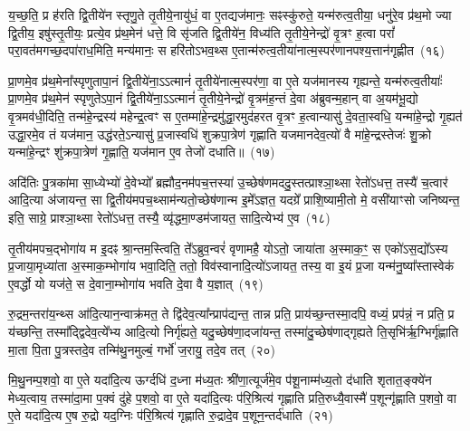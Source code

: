 य॒च्छ॒ति॒ प्र ह॑रति द्वि॒तीये॑न स्तृणु॒ते तृ॒तीये॒नायु॑धं॒ वा ए॒तद्यज॑मानः॒ सꣴस्कु॑रुते॒ यन्म॑रुत्व॒तीया॒ धनु॑रे॒व प्र॑थ॒मो ज्या द्वि॒तीय॒ इषु॑स्तृ॒तीयः॒ प्रत्ये॒व प्र॑थ॒मेन॑ धत्ते॒ वि सृ॑जति द्वि॒तीये॑न॒ विध्य॑ति तृ॒तीये॒नेन्द्रो॑ वृ॒त्रꣳ ह॒त्वा परां᳚ परा॒वत॑मगच्छ॒दपा॑राध॒मिति॒ मन्य॑मानः॒ स हरि॑तो\-ऽभव॒थ्स ए॒तान्म॑रुत्व॒तीया॑नात्म॒स्पर॑णानपश्य॒त्तान॑गृह्णीत~(१६)

प्रा॒णमे॒व प्र॑थ॒मेना᳚स्पृणुतापा॒नं द्वि॒तीये॑ना॒ऽऽत्मानं॑ तृ॒तीये॑नात्म॒स्पर॑णा॒ वा ए॒ते यज॑मानस्य गृह्यन्ते॒ यन्म॑रुत्व॒तीयाः᳚ प्रा॒णमे॒व प्र॑थ॒मेन॑ स्पृणुते\-ऽपा॒नं द्वि॒तीये॑ना॒ऽऽत्मानं॑ तृ॒तीये॒नेन्द्रो॑ वृ॒त्रम॑ह॒न्तं दे॒वा अ॑ब्रुवन्म॒हान् वा अ॒यम॑भू॒द्यो वृ॒त्रमव॑धी॒दिति॒ तन्म॑हे॒न्द्रस्य॑ महेन्द्र॒त्वꣳ स ए॒तम्मा॑हे॒न्द्रमु॑द्धा॒रमुद॑हरत वृ॒त्रꣳ ह॒त्वान्यासु॑ दे॒वता॒स्वधि॒ यन्मा॑हे॒न्द्रो गृ॒ह्यत॑ उद्धा॒रमे॒व तं यज॑मान॒ उद्ध॑रते॒\-ऽन्यासु॑ प्र॒जास्वधि॑ शुक्रपा॒त्रेण॑ गृह्णाति यजमानदेव॒त्यो॑ वै मा॑हे॒न्द्रस्तेजः॑ शु॒क्रो यन्मा॑हे॒न्द्रꣳ शु॑क्रपा॒त्रेण॑ गृ॒ह्णाति॒ यज॑मान ए॒व तेजो॑ दधाति॥~(१७)

{\anuvakamend[{प्र॒थ॒मेना॑गृह्णीत दे॒वता᳚स्व॒ष्टाविꣳ॑शतिश्च}]}%

अदि॑तिः पु॒त्रका॑मा सा॒ध्येभ्यो॑ दे॒वेभ्यो᳚ ब्रह्मौद॒नम॑पच॒त्तस्या॑ उ॒च्छेष॑णमददु॒स्तत्प्राश्ञा॒थ्सा रेतो॑\-ऽधत्त॒ तस्यै॑ च॒त्वार॑ आदि॒त्या अ॑जायन्त॒ सा द्वि॒तीय॑मपच॒थ्साम॑न्यतो॒च्छेष॑णान्म इ॒मे᳚\-ऽज्ञत॒ यदग्रे᳚ प्राशि॒ष्यामी॒तो मे॒ वसी॑याꣳसो जनिष्यन्त॒ इति॒ साग्रे॒ प्राश्ञा॒थ्सा रेतो॑\-ऽधत्त॒ तस्यै॒ व्यृ॑द्धमा॒ण्डम॑जायत॒ सादि॒त्येभ्य॑ ए॒व~(१८)

तृ॒तीय॑मपच॒द्भोगा॑य म इ॒दꣴ श्रा॒न्तम॒स्त्विति॒ ते᳚\-ऽब्रुव॒न्वरं॑ वृणामहै॒ यो\-ऽतो॒ जाया॑ता अ॒स्माक॒ꣳ॒ स एको॑\-ऽस॒द्यो᳚\-ऽस्य प्र॒जाया॒मृध्या॑ता अ॒स्माक॒म्भोगा॑य भवा॒दिति॒ ततो॒ विव॑स्वानादि॒त्यो॑\-ऽजायत॒ तस्य॒ वा इ॒यं प्र॒जा यन्म॑नु॒ष्या᳚स्तास्वेक॑ ए॒वर्द्धो यो यज॑ते॒ स दे॒वाना॒म्भोगा॑य भवति दे॒वा वै य॒ज्ञात्~(१९)

रु॒द्रम॒न्तरा॑य॒न्थ्स आ॑दि॒त्यान॒न्वाक्र॑मत॒ ते द्वि॑देव॒त्या᳚न्प्राप॑द्यन्त॒ तान्न प्रति॒ प्राय॑च्छ॒न्तस्मा॒दपि॒ वध्यं॒ प्रप॑न्नं॒ न प्रति॒ प्र य॑च्छन्ति॒ तस्मा᳚द्द्विदेव॒त्ये᳚भ्य आदि॒त्यो निर्गृ॑ह्यते॒ यदु॒च्छेष॑णा॒दजा॑यन्त॒ तस्मा॑दु॒च्छेष॑णाद्गृह्यते ति॒सृभि॑र्\mbox{}ऋ॒ग्भिर्गृ॑ह्णाति मा॒ता पि॒ता पु॒त्रस्तदे॒व तन्मि॑थु॒नमुल्बं॒ गर्भो॑ ज॒रायु॒ तदे॒व तत्~(२०)

मि॒थु॒नम्प॒शवो॒ वा ए॒ते यदा॑दि॒त्य ऊर्ग्दधि॑ द॒ध्ना म॑ध्य॒तः श्री॑णा॒त्यूर्ज॑मे॒व प॑शू॒नाम्म॑ध्य॒तो द॑धाति शृतात॒ङ्क्ये॑न मेध्य॒त्वाय॒ तस्मा॑दा॒मा प॒क्वं दु॑हे प॒शवो॒ वा ए॒ते यदा॑दि॒त्यः प॑रि॒श्रित्य॑ गृह्णाति प्रति॒रुध्यै॒वास्मै॑ प॒शून्गृ॑ह्णाति प॒शवो॒ वा ए॒ते यदा॑दि॒त्य ए॒ष रु॒द्रो यद॒ग्निः प॑रि॒श्रित्य॑ गृह्णाति रु॒द्रादे॒व प॒शून॒न्तर्द॑धाति~(२१)

